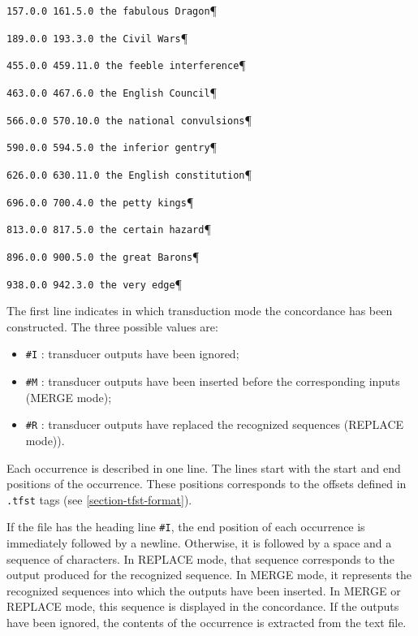 \verb$157.0.0 161.5.0 the fabulous Dragon$\P

\verb$189.0.0 193.3.0 the Civil Wars$\P

\verb$455.0.0 459.11.0 the feeble interference$\P

\verb$463.0.0 467.6.0 the English Council$\P

\verb$566.0.0 570.10.0 the national convulsions$\P

\verb$590.0.0 594.5.0 the inferior gentry$\P

\verb$626.0.0 630.11.0 the English constitution$\P

\verb$696.0.0 700.4.0 the petty kings$\P

\verb$813.0.0 817.5.0 the certain hazard$\P

\verb$896.0.0 900.5.0 the great Barons$\P

\verb$938.0.0 942.3.0 the very edge$\P

\bigskip
\noindent The first line indicates in which transduction mode the concordance has
been constructed. The three possible values are:

\begin{itemize}
  \item \verb+#I+ : transducer outputs have been ignored;

  \item \verb+#M+ : transducer outputs have been inserted before the
  corresponding inputs (MERGE mode);
  
  \item \verb+#R+ : transducer outputs have replaced the recognized sequences (REPLACE mode)).
\end{itemize}

\bigskip
\noindent Each occurrence is described in one line. The lines start with the start
and end positions of the occurrence. These positions corresponds to the offsets
defined in \verb$.tfst$ tags (see \ref{section-tfst-format}).

\bigskip
\noindent If the file has the heading line \verb+#I+, the end position of each
occurrence is immediately followed by a newline. Otherwise, it is followed by a
space and a sequence of characters. In REPLACE mode, that sequence corresponds to
the output produced for the recognized sequence. In MERGE mode, it represents the
recognized sequences into which the outputs have been inserted. In MERGE or
REPLACE mode, this sequence is displayed in the concordance. If the outputs have
been ignored, the contents of the occurrence is extracted from the text file.


